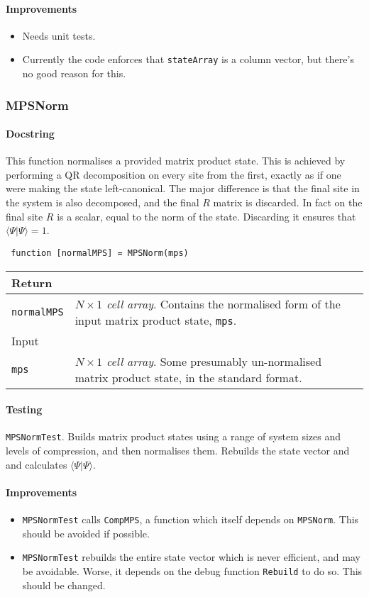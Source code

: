  \paragraph{Improvements}
 \begin{itemize}
 \item Needs unit tests.
 \item Currently the code enforces that \lstinline$stateArray$ is a column vector, but there's no good reason for this.
 \end{itemize}
 
 \subsubsection{MPSNorm}
 \paragraph{Docstring}
 This function normalises a provided matrix product state. This is achieved by performing a QR decomposition on every site from the first, exactly as if one were making the state left-canonical. The major difference is that the final site in the system is also decomposed, and the final \(R\) matrix is discarded. In fact on the final site \(R\) is a scalar, equal to the norm of the state. Discarding it ensures that \(\langle \Psi | \Psi \rangle = 1\).
 \begin{lstlisting}
 function [normalMPS] = MPSNorm(mps) \end{lstlisting}
 \begin{longtabu}{X[1,l]X[4,l]}
 \hline
 Return & \\ \hline
 \lstinline$normalMPS$ & \emph{\(N \times 1\) cell array}. Contains the normalised form of the input matrix product state, \lstinline$mps$.  \\ \hline
 Input & \\ \hline
 \lstinline$mps$ & \emph{\(N \times 1\) cell array}. Some presumably un-normalised matrix product state, in the standard format. \\
 \hline
 \end{longtabu}
 \paragraph{Testing}
 \lstinline$MPSNormTest$. Builds matrix product states using a range of system sizes and levels of compression, and then normalises them. Rebuilds the state vector and and calculates \(\langle \Psi | \Psi \rangle\). 
 \paragraph{Improvements}
 \begin{itemize}
 \item \lstinline$MPSNormTest$ calls \lstinline$CompMPS$, a function which itself depends on \lstinline$MPSNorm$. This should be avoided if possible. 
 \item \lstinline$MPSNormTest$ rebuilds the entire state vector which is never efficient, and may be avoidable. Worse, it depends on the debug function \lstinline$Rebuild$ to do so. This should be changed.
 \end{itemize}
 
